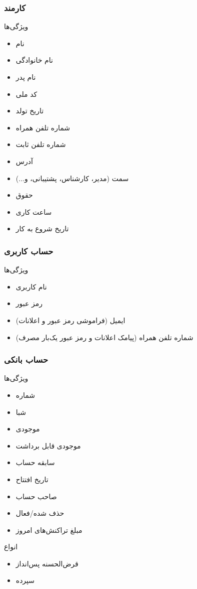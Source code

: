 \documentclass{article}
\begin{document}
        \subsubsection{کارمند}
            ویژگی‌ها
            \begin{itemize}
                \item نام
                \item نام خانوادگی
                \item نام پدر
                \item کد ملی
                \item تاریخ تولد
                \item شماره تلفن همراه
                \item شماره تلفن ثابت
                \item آدرس
                \item سمت (مدیر، کارشناس، پشتیبانی، و...)
                \item حقوق
                \item ساعت کاری
                \item تاریخ شروع به کار
            \end{itemize}

        \subsubsection{حساب کاربری}
            ویژگی‌ها
            \begin{itemize}
                \item نام کاربری
                \item رمز عبور
                \item ایمیل (فراموشی رمز عبور و اعلانات)
                \item شماره تلفن همراه (پیامک اعلانات و رمز عبور یک‌بار مصرف)
            \end{itemize}

        \subsubsection{حساب بانکی}
            ویژگی‌ها
            \begin{itemize}
                \item شماره
                \item شبا
                \item موجودی
                \item موجودی قابل برداشت
                \item سابقه حساب
                \item تاریخ افتتاح
                \item صاحب حساب
                \item حذف شده/فعال
                \item مبلغ تراکنش‌های امروز
            \end{itemize}
            انواع
            \begin{itemize}
                \item قرض‌الحسنه پس‌انداز
                \item سپرده
            \end{itemize}
\end{document}
